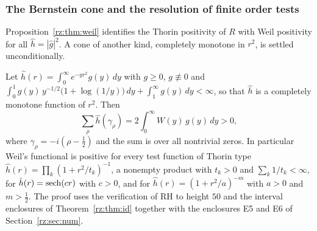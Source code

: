 \subsubsection{The Bernstein cone and the resolution of finite order tests}

Proposition~\ref{rz:thm:weil} identifies the Thorin positivity of $R$ with Weil positivity for all $\hat h=|\hat g|^2$. A cone of another kind, completely monotone in $r^2$, is settled unconditionally.

\begin{theorem}\label{rz:thm:bernsteincone}
Let $\hat h(r)=\int_0^\infty e^{-yr^2}g(y)\,dy$ with $g\ge0$, $g\not\equiv0$ and $\int_0^1g(y)\,y^{-1/2}\bigl(1+\log(1/y)\bigr)\,dy+\int_1^\infty g(y)\,dy<\infty$, so that $\hat h$ is a completely monotone function of $r^2$. Then
\[
\sum_\rho\hat h(\gamma_\rho)=2\int_0^\infty W(y)\,g(y)\,dy>0,
\]
where $\gamma_\rho=-i(\rho-\frac12)$ and the sum is over all nontrivial zeros. In particular Weil's functional is positive for every test function of Thorin type $\hat h(r)=\prod_k(1+r^2/t_k)^{-1}$, a nonempty product with $t_k>0$ and $\sum_k1/t_k<\infty$, for $\hat h(r)=\operatorname{sech}(cr)$ with $c>0$, and for $\hat h(r)=(1+r^2/a)^{-m}$ with $a>0$ and $m>\frac12$. The proof uses the verification of RH to height $50$ and the interval enclosures of Theorem~\ref{rz:thm:id} together with the enclosures E5 and E6 of Section~\ref{rz:sec:num}.
\end{theorem}

